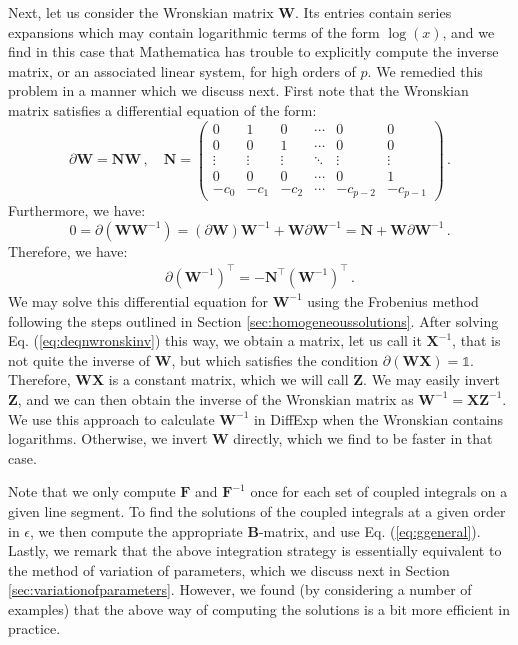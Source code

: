 \documentclass{article}
\begin{document}
Next, let us consider the Wronskian matrix $\mathbf{W}$. Its entries contain series expansions which may contain logarithmic terms of the form $\log(x)$, and we find in this case that Mathematica has trouble to explicitly compute the inverse matrix, or an associated linear system, for high orders of $p$. We remedied this problem in a manner which we discuss next. First note that the Wronskian matrix satisfies a differential equation of the form:
\begin{equation}
    \partial \mathbf{W}=\mathbf{N}\mathbf{W}\,,\quad \mathbf{N} = \left(\begin{array}{cccccc}
0 & 1 & 0 & \cdots & 0 & 0 \\
0 & 0 & 1 & \cdots & 0 & 0 \\
\vdots & \vdots & \vdots & \ddots & \vdots & \vdots \\
0 & 0 & 0 & \cdots & 0 & 1 \\
-c_0 & -c_{1} & -c_{2} & \cdots & -c_{p-2} & -c_{p-1}
\end{array}\right)\,.
\end{equation}
Furthermore, we have:
\begin{equation}
    0 = \partial (\mathbf{W} \mathbf{W}^{-1}) = (\partial \mathbf{W} ) \mathbf{W}^{-1} + \mathbf{W} \partial \mathbf{W}^{-1} = \mathbf{N} + \mathbf{W} \partial \mathbf{W}^{-1}\,.
\end{equation}
Therefore, we have:
\begin{align}
    \label{eq:deqnwronskinv}
    \partial (\mathbf{W}^{-1})^\intercal = -\mathbf{N}^\intercal (\mathbf{W}^{-1})^\intercal\,.
\end{align}
We may solve this differential equation for $\mathbf{W}^{-1}$ using the Frobenius method following the steps outlined in Section \ref{sec:homogeneoussolutions}. After solving Eq. (\ref{eq:deqnwronskinv}) this way, we obtain a matrix, let us call it $\mathbf{X}^{-1}$, that is not quite the inverse of $\mathbf{W}$, but which satisfies the condition $\partial (\mathbf{W}\mathbf{X}) = \mathbb{1}$. Therefore, $\mathbf{W}\mathbf{X}$ is a constant matrix, which we will call $\mathbf{Z}$. We may easily invert $\mathbf{Z}$, and we can then obtain the inverse of the Wronskian matrix as $\mathbf{W}^{-1} = \mathbf{X}\mathbf{Z}^{-1}$. We use this approach to calculate $\mathbf{W}^{-1}$ in DiffExp when the Wronskian contains logarithms. Otherwise, we invert $\mathbf{W}$ directly, which we find to be faster in that case.

Note that we only compute $\mathbf{F}$ and $\mathbf{F}^{-1}$ once for each set of coupled integrals on a given line segment. To find the solutions of the coupled integrals at a given order in $\epsilon$, we then compute the appropriate $\mathbf{B}$-matrix, and use Eq. (\ref{eq:ggeneral}). Lastly, we remark that the above integration strategy is essentially equivalent to the method of variation of parameters, which we discuss next in Section \ref{sec:variationofparameters}. However, we found (by considering a number of examples) that the above way of computing the solutions is a bit more efficient in practice.
\end{document}
